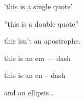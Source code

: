 
\def\mytitle{MultiMarkdown Swedish Test}

'this is a single quote'

''this is a double quote''

this isn't an apostrophe.

this is an em --- dash

this is an en -- dash

and an ellipsis{\ldots}




